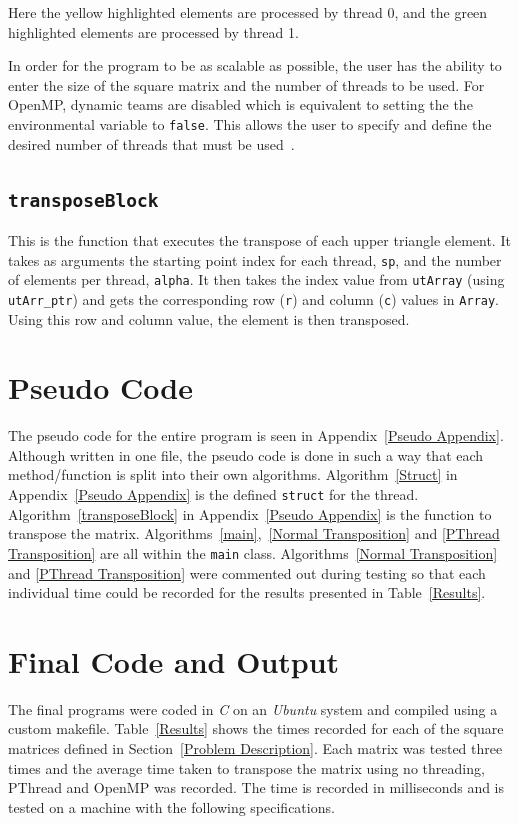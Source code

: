 \documentclass[10pt, conference]{IEEEtran}
\def\code#1{\texttt{#1}}
\begin{document}
Here the yellow highlighted elements are processed by thread 0, and the green highlighted elements are processed by thread 1.

In order for the program to be as scalable as possible, the user has the ability to enter the size of the square matrix and the number of threads to be used. For OpenMP, dynamic teams are disabled which is equivalent to setting the the environmental variable to \code{false}. This allows the user to specify and define the desired number of threads that must be used~\cite{Thread Count}.

\subsection{\code{transposeBlock}}
This is the function that executes the transpose of each upper triangle element. It takes as arguments the starting point index for each thread, \code{sp}, and the number of elements per thread, \code{alpha}. It then takes the index value from \code{utArray} (using \code{utArr\_ptr}) and gets the corresponding row (\code{r}) and column (\code{c}) values in \code{Array}. Using this row and column value, the element is then transposed.


\section{Pseudo Code}
\label{Pseudo Code}
The pseudo code for the entire program is seen in Appendix~\ref{Pseudo Appendix}. Although written in one file, the pseudo code is done in such a way that each method/function is split into their own algorithms. Algorithm~\ref{Struct} in Appendix~\ref{Pseudo Appendix} is the defined \code{struct} for the thread. Algorithm~\ref{transposeBlock} in Appendix~\ref{Pseudo Appendix} is the function to transpose the matrix. Algorithms~\ref{main},~\ref{Normal Transposition} and \ref{PThread Transposition} are all within the \code{main} class. Algorithms~\ref{Normal Transposition} and \ref{PThread Transposition} were commented out during testing so that each individual time could be recorded for the results presented in Table~\ref{Results}.

\section{Final Code and Output}
\label{Final Code and Output}

The final programs were coded in \emph{C} on an \emph{Ubuntu} system and compiled using a custom makefile. Table~\ref{Results} shows the times recorded for each of the square matrices defined in Section~\ref{Problem Description}. Each matrix was tested three times and the average time taken to transpose the matrix using no threading, PThread and OpenMP was recorded. The time is recorded in milliseconds and is tested on a machine with the following specifications.
\end{document}
